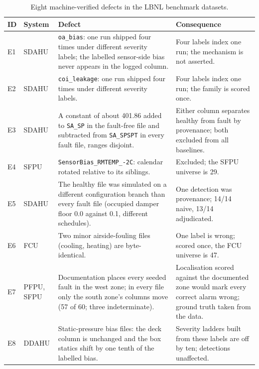 \documentclass[11pt,letterpaper]{article}
\begin{document}
\begin{table}[t]
\centering
\scriptsize
\setlength{\tabcolsep}{4pt}
\renewcommand{\arraystretch}{1.0}
\begin{tabular}{@{}>{\raggedright\arraybackslash}p{0.5cm}>{\raggedright\arraybackslash}p{1.3cm}>{\raggedright\arraybackslash}p{7.2cm}>{\raggedright\arraybackslash}p{6.3cm}@{}}
\hline
ID & System & Defect & Consequence \\
\hline
E1 & SDAHU & \texttt{oa\_bias}: one run shipped four times under different severity labels; the labelled sensor-side bias never appears in the logged column. & Four labels index one run; the mechanism is not asserted. \\
E2 & SDAHU & \texttt{coi\_leakage}: one run shipped four times under different severity labels. & Four labels index one run; the family is scored once. \\
E3 & SDAHU & A constant of about 401.86 added to \texttt{SA\_SP} in the fault-free file and subtracted from \texttt{SA\_SPSPT} in every fault file, ranges disjoint. & Either column separates healthy from fault by provenance; both excluded from all baselines. \\
E4 & SFPU & \texttt{SensorBias\_RMTEMP\_-2C}: calendar rotated relative to its siblings. & Excluded; the SFPU universe is 29. \\
E5 & SDAHU & The healthy file was simulated on a different configuration branch than every fault file (occupied damper floor 0.0 against 0.1, different schedules). & One detection was provenance; 14/14 naive, 13/14 adjudicated. \\
E6 & FCU & Two minor airside-fouling files (cooling, heating) are byte-identical. & One label is wrong; scored once, the FCU universe is 47. \\
E7 & PFPU, SFPU & Documentation places every seeded fault in the west zone; in every file only the south zone's columns move (57 of 60; three indeterminate). & Localisation scored against the documented zone would mark every correct alarm wrong; ground truth taken from the data. \\
E8 & DDAHU & Static-pressure bias files: the deck column is unchanged and the box statics shift by one tenth of the labelled bias. & Severity ladders built from these labels are off by ten; detections unaffected. \\
\hline
\end{tabular}
\caption{Eight machine-verified defects in the LBNL benchmark datasets.}
\label{tab:errata}
\end{table}
\end{document}
